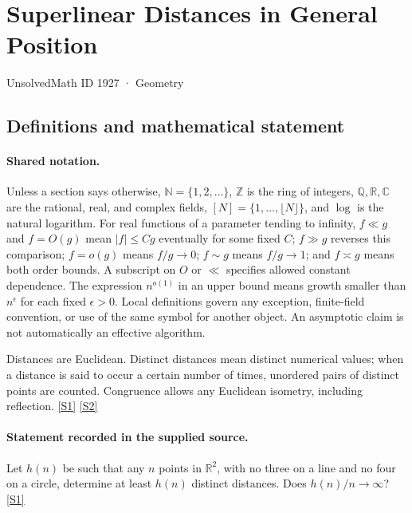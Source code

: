 \documentclass[11pt,a4paper]{article}
\newcommand{\N}{\mathbb{N}}
\newcommand{\Z}{\mathbb{Z}}
\newcommand{\Q}{\mathbb{Q}}
\newcommand{\R}{\mathbb{R}}
\newcommand{\C}{\mathbb{C}}
\newcommand{\sref}[2]{\hyperlink{source:#1:#2}{[S#2]}}
\begin{document}

\setcounter{section}{1926}

\section{Superlinear Distances in General Position}\label{1927}

{\small\sffamily UnsolvedMath ID 1927 · Geometry}

\subsection{Definitions and mathematical statement}

\paragraph{Shared notation.}Unless a section says otherwise, $\N=\{1,2,\ldots\}$,
$\Z$ is the ring of integers, $\Q,\R,\C$ are the rational, real, and complex
fields, $[N]=\{1,\ldots,\lfloor N\rfloor\}$, and $\log$ is the natural
logarithm. For real functions of a parameter tending to infinity,
$f\ll g$ and $f=O(g)$ mean $|f|\leq Cg$ eventually for some fixed $C$;
$f\gg g$ reverses this comparison; $f=o(g)$ means $f/g\to0$;
$f\sim g$ means $f/g\to1$; and $f\asymp g$ means both order bounds.
A subscript on $O$ or $\ll$ specifies allowed constant dependence.
The expression $n^{o(1)}$ in an upper bound means growth smaller than
$n^\epsilon$ for each fixed $\epsilon>0$. Local definitions govern any
exception, finite-field convention, or use of the same symbol for another
object. An asymptotic claim is not automatically an effective algorithm.



Distances are Euclidean. Distinct distances mean distinct numerical values; when a distance is said to occur a certain number of times, unordered pairs of distinct points are counted. Congruence allows any Euclidean isometry, including reflection. \sref{1927}{1} \sref{1927}{2}

\paragraph{Statement recorded in the supplied source.}
Let $h(n)$ be such that any $n$ points in $\mathbb{R}^2$, with no three on a line and no four on a circle, determine at least $h(n)$ distinct distances. Does $h(n)/n\to \infty$? \sref{1927}{1}
\end{document}
